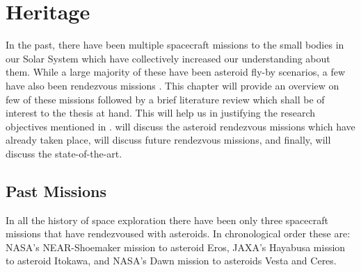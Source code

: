 \chapter{Heritage}
\label{chap:heritage}
\graphicspath{{Mission_Heritage/Images/}}

In the past, there have been multiple spacecraft missions to the small bodies in our Solar System which have collectively increased our understanding about them. While a large majority of these have been asteroid fly-by scenarios, a few have also been rendezvous missions \parencite{esa_mission2asteroids_web}. This chapter will provide an overview on few of these missions followed by a brief literature review which shall be of interest to the thesis at hand. This will help us in justifying the research objectives mentioned in .  will discuss the asteroid rendezvous missions which have already taken place,  will discuss future rendezvous missions, and finally,  will discuss the state-of-the-art.

\section{Past Missions}
\label{sec:past_missions}
In all the history of space exploration there have been only three spacecraft missions that have rendezvoused with asteroids. In chronological order these are: \gls{NASA}'s \gls{NEAR}-Shoemaker mission to asteroid Eros, \gls{JAXA}'s Hayabusa mission to asteroid Itokawa, and \gls{NASA}'s Dawn mission to asteroids Vesta and Ceres.

